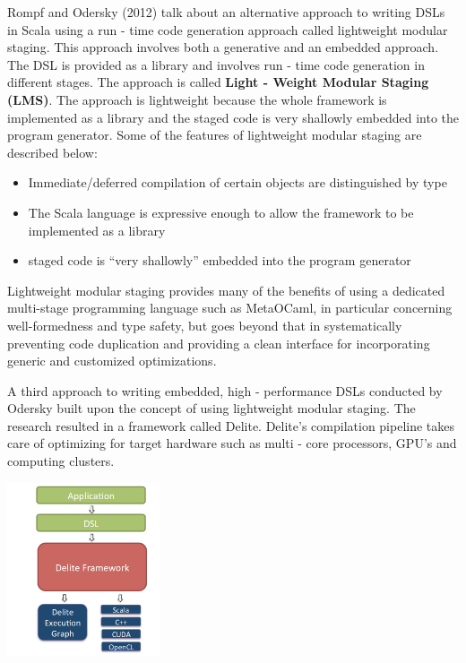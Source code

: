 \documentclass[12 pt]{article}
\begin{document}
\noindent
Rompf and Odersky (2012) talk about an alternative approach to writing DSLs in Scala using a run - time code generation approach called lightweight modular staging. This approach involves both a generative and an embedded approach. The DSL is provided as a library and involves run - time code generation in different stages. The approach is called \textbf{Light - Weight Modular Staging (LMS)}. The approach is lightweight because the whole framework is implemented as a library and the staged code is very shallowly embedded into the program generator. Some of the features of lightweight modular staging are described below:
\begin{itemize}
\item Immediate/deferred compilation of certain objects are distinguished by type
\item The Scala language is expressive enough to allow the framework to be implemented as a library
\item staged code is “very shallowly” embedded into the program generator
\end{itemize}
\bigskip

\noindent
Lightweight modular staging provides many of the benefits of using a dedicated multi-stage programming language such as MetaOCaml, in particular concerning well-formedness and type safety, but goes beyond that in systematically preventing code duplication and providing a clean interface for incorporating generic and customized optimizations.
\bigskip

\noindent
A third approach to writing embedded, high - performance DSLs conducted by Odersky built upon the concept of using lightweight modular staging. The research resulted in a framework called Delite. Delite's compilation pipeline takes care of optimizing for target hardware such as multi - core processors, GPU's and computing clusters.
\bigskip

\begin{center}
    \includegraphics[width=170px]{figures/delite.png}
\end{center}
\end{document}
